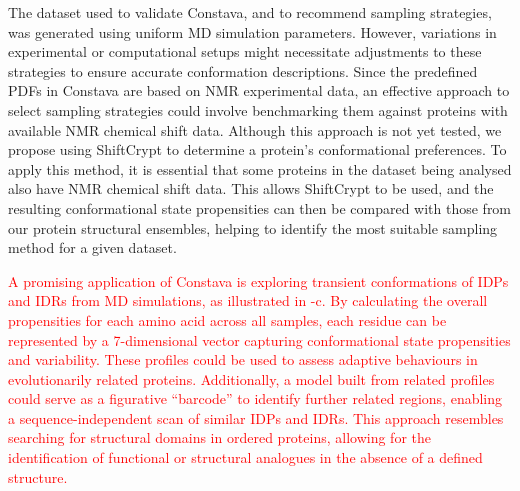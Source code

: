 The dataset used to validate Constava, and to recommend sampling strategies, was generated using uniform MD simulation parameters. However, variations in experimental or computational setups might necessitate adjustments to these strategies to ensure accurate conformation descriptions. Since the predefined PDFs in Constava are based on NMR experimental data, an effective approach to select sampling strategies could involve benchmarking them against proteins with available NMR chemical shift data. Although this approach is not yet tested, we propose using ShiftCrypt \cite{orlando_shiftcrypt_2020} to determine a protein's conformational preferences. To apply this method, it is essential that some proteins in the dataset being analysed also have NMR chemical shift data. This allows ShiftCrypt to be used, and the resulting conformational state propensities can then be compared with those from our protein structural ensembles, helping to identify the most suitable sampling method for a given dataset.


\textcolor{red}{A promising application of Constava is exploring transient conformations of IDPs and IDRs from MD simulations, as illustrated in -c. By calculating the overall propensities for each amino acid across all samples, each residue can be represented by a 7-dimensional vector capturing conformational state propensities and variability. These profiles could be used to assess adaptive behaviours in evolutionarily related proteins. Additionally, a model built from related profiles could serve as a figurative ``barcode'' to identify further related regions, enabling a sequence-independent scan of similar IDPs and IDRs. This approach resembles searching for structural domains in ordered proteins, allowing for the identification of functional or structural analogues in the absence of a defined structure.}

